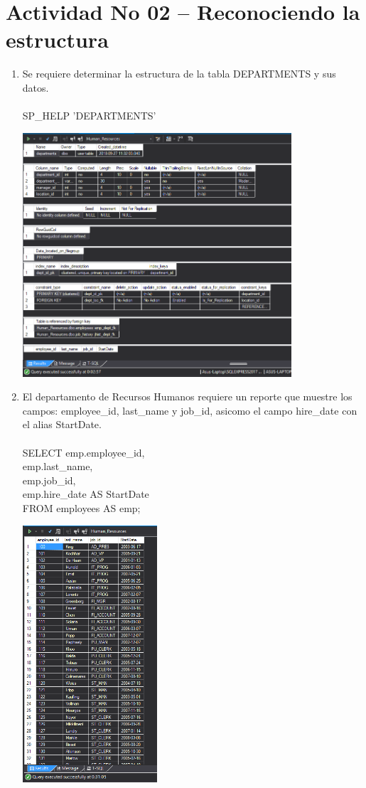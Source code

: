 \section{Actividad No 02 – Reconociendo la estructura}

\begin{enumerate}[1.]
	\item Se requiere determinar la estructura de la tabla DEPARTMENTS y sus datos.
	\\
	\\SP\_HELP 'DEPARTMENTS'

	\begin{center}
	\includegraphics[width=10cm]{./Imagenes/Actividad02_1}
	\end{center}

	\item El departamento de Recursos Humanos requiere un reporte que muestre los campos: employee\_id, last\_name y job\_id, asicomo el campo hire\_date con el alias StartDate.
	\\
	\\SELECT emp.employee\_id, \\
	emp.last\_name, \\
	emp.job\_id, \\
	emp.hire\_date AS StartDate \\
	FROM employees AS emp;

	\begin{center}
	\includegraphics[width=5cm]{./Imagenes/Actividad02_2}
	\end{center}


\end{enumerate}
